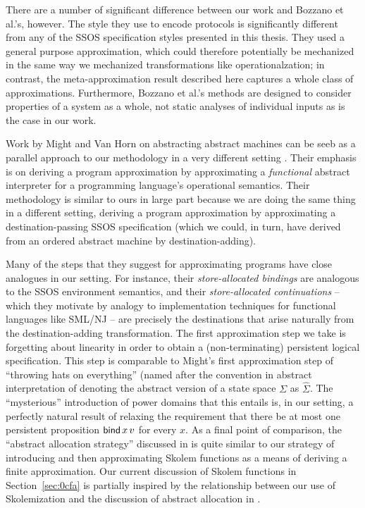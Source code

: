 There are a number of significant difference between our work and
Bozzano et al.'s, however. The style they use to encode protocols is
significantly different from any of the SSOS specification styles
presented in this thesis. They used a general purpose approximation,
which could therefore potentially be mechanized in the same way we
mechanized transformations like operationalzation; in contrast, the
meta-approximation result described here captures a whole class of
approximations. Furthermore, Bozzano et al.'s methods are designed to
consider properties of a system as a whole, not static analyses of
individual inputs as is the case in our work.

Work by Might and Van Horn on abstracting abstract machines can be
seeb as a parallel approach to our methodology in a very different
setting
\cite{might10resolving,might10abstract,might10abstracting}. Their
emphasis is on deriving a program approximation by approximating a
{\it functional} abstract interpreter for a programming language's
operational semantics. Their methodology is similar to ours in large
part because we are doing the same thing in a different setting,
deriving a program approximation by approximating a
destination-passing SSOS specification (which we could, in turn, have
derived from an ordered abstract machine by destination-adding).

Many of the steps that they suggest for approximating programs have
close analogues in our setting. For instance, their {\it
  store-allocated bindings} are analogous to the SSOS environment
semantics, and their {\it store-allocated continuations} -- which they
motivate by analogy to implementation techniques for functional
languages like SML/NJ -- are precisely the destinations that arise
naturally from the destination-adding transformation. The first
approximation step we take is forgetting about linearity in order to
obtain a (non-terminating) persistent logical specification. This step
is comparable to Might's first approximation step of ``throwing hats
on everything'' (named after the convention in abstract interpretation
of denoting the abstract version of a state space $\Sigma$ as
$\hat{\Sigma}$. The ``mysterious'' introduction of power domains that
this entails is, in our setting, a perfectly natural result of
relaxing the requirement that there be at most one persistent
proposition ${\sf bind}\,x\,v$ for every $x$. As a final point of
comparison, the ``abstract allocation strategy'' discussed in
\cite{might10abstracting} is quite similar to our strategy of
introducing and then approximating Skolem functions as a means of
deriving a finite approximation. Our current discussion of Skolem
functions in Section~\ref{sec:0cfa} is partially inspired by the
relationship between our use of Skolemization and the discussion of
abstract allocation in \cite{might10abstracting}.

